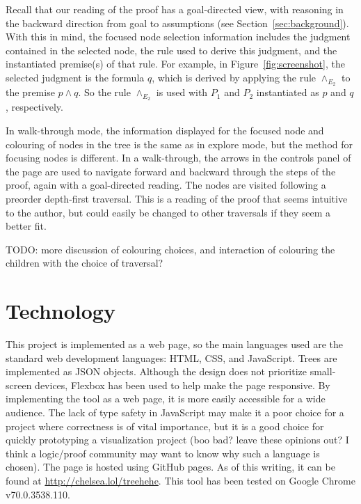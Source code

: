 \documentclass[conference]{IEEEtran}
\begin{document}
Recall that our reading of the proof has a goal-directed view, with reasoning in the backward direction from goal to assumptions (see Section~\ref{sec:background}). With this in mind, the focused node selection information includes the judgment contained in the selected node, the rule used to derive this judgment, and the instantiated premise(s) of that rule. For example, in Figure~\ref{fig:screenshot}, the selected judgment is the formula $q$, which is derived by applying the rule $\wedge_{E_2}$ to the premise $p \wedge q$. So the rule $\wedge_{E_2}$ is used with $P_1$ and $P_2$ instantiated as $p$ and $q$, respectively.

In walk-through mode, the information displayed for the focused node and colouring of nodes in the tree is the same as in explore mode, but the method for focusing nodes is different. In a walk-through, the arrows in the controls panel of the page are used to navigate forward and backward through the steps of the proof, again with a goal-directed reading. The nodes are visited following a preorder depth-first traversal. This is a reading of the proof that seems intuitive to the author, but could easily be changed to other traversals if they seem a better fit.

TODO: more discussion of colouring choices, and interaction of colouring the children with the choice of traversal? \\

\section{Technology}
\label{sec:technology}

This project is implemented as a web page, so the main languages used are the standard web development languages: HTML, CSS, and JavaScript. Trees are implemented as JSON objects. Although the design does not prioritize small-screen devices, Flexbox has been used to help make the page responsive. By implementing the tool as a web page, it is more easily accessible for a wide audience. The lack of type safety in JavaScript may make it a poor choice for a project where correctness is of vital importance, but it is a good choice for quickly prototyping a visualization project (boo bad? leave these opinions out? I think a logic/proof community may want to know why such a language is chosen). The page is hosted using GitHub pages. As of this writing, it can be found at \url{http://chelsea.lol/treehehe}. This tool has been tested on Google Chrome v70.0.3538.110.
\end{document}
